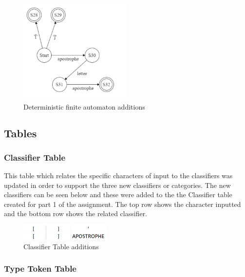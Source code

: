 \documentclass{article}
\begin{document}
				\begin{center}
					\begin{figure}[H]
			 			\includegraphics[width=0.5\textwidth]{part2automaton.jpeg}
			 			\centering
			  			\caption{Deterministic finite automaton additions}
			  			\label{fig:automaton}
					\end{figure}
				\end{center}
				

			\subsection{Tables}
			\subsubsection{Classifier Table}
			
			This table which relates the specific characters of input to the classifiers was updated in order to support the three new classifiers or categories. The new classifiers can be seen below and these were added to the the Classifier table created for part 1 of the assignment. The top row shows the character inputted and the bottom row shows the related classifier.
			
			 \begin{center}
					\begin{figure}[H]
			 			\includegraphics[width=0.4\textwidth]{ctpart2.png}
			 			\centering
			  			\caption{Classifier Table additions}
			  			\label{fig:cttable}
					\end{figure}
				\end{center}
				
				\subsubsection{Type Token Table}
			
\end{document}
